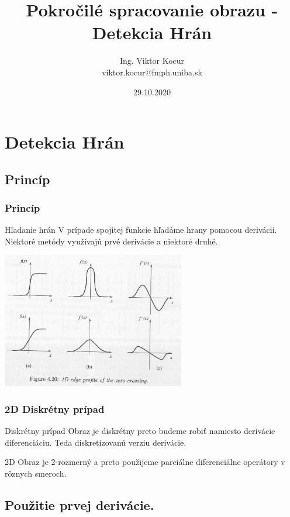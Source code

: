 \documentclass{beamer}
\title[6. cvičenie]{Pokročilé spracovanie obrazu - Detekcia Hrán}
\author[Kocur]{Ing. Viktor Kocur \\{\small viktor.kocur@fmph.uniba.sk}}
\institute{DAI FMFI UK}
\date{29.10.2020}
\begin{document}

\begin{frame}
  \titlepage
\end{frame}

\section{Detekcia Hrán}
\subsection{Princíp}

\begin{frame}
\frametitle{Princíp}
  \begin{block}{Hľadanie hrán}
  V prípade spojitej funkcie hľadáme hrany pomocou derivácii. Niektoré metódy využívajú prvé derivácie a niektoré druhé.
  \end{block}

  \begin{center}
  \includegraphics[width=0.6\textwidth]{zero-crossing.png}
  \end{center}
\end{frame}

\begin{frame}
\frametitle{2D Diskrétny prípad}
  \begin{block}{Diskrétny prípad}
  Obraz je diskrétny preto budeme robiť namiesto derivácie diferenciáciu. Teda diskretizovanú verziu derivácie.
  \end{block}

  \begin{block}{2D}
  Obraz je 2-rozmerný a preto použijeme parciálne diferenciálne operátory v rôznych smeroch. 
  \end{block}
\end{frame}

\subsection{Použitie prvej derivácie.}
\end{document}
